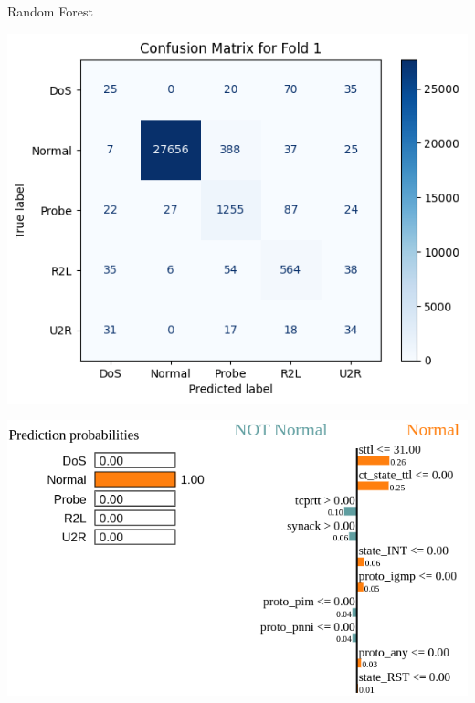 \documentclass[12pt,aspectratio=169,notheorems]{beamer}
\begin{document}
\begin{frame}{Random Forest}
    \vspace{2ex}
    \hspace*{-0.8cm}
    \begin{minipage}[t]{0.40\textwidth}
        \centering
        \includegraphics[width=\textwidth]{confusion_matrx_RF.png}
        \hspace{-1cm}
        \hspace{20cm}
    \end{minipage}
    \hspace{0.5cm}
    \begin{minipage}[t]{0.45\textwidth}
        \centering
        \includegraphics[width=1.4\textwidth]{lime_result.png}
        \hspace{20cm}
    \end{minipage}
\end{frame}
\end{document}
